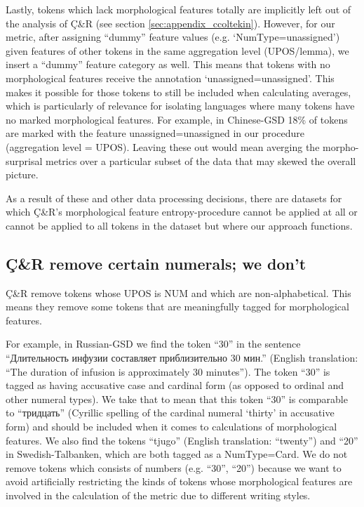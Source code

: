 \documentclass[USenglish]{article}
\begin{document}
Lastly, tokens which lack morphological features totally are implicitly left out of the analysis of Ç\&R (see section \ref{sec:appendix_ccoltekin}).
However, for our metric, after assigning ``dummy'' feature values  (e.g. `NumType=unassigned') given features of other tokens in the same aggregation level (UPOS/lemma), we insert a ``dummy'' feature category as well. 
This means that tokens with no morphological features receive the annotation `unassigned=unassigned'.
This makes it possible for those tokens to still be included when calculating averages, which is particularly of relevance for isolating languages where many tokens have no marked morphological features.
For example, in Chinese-GSD 18\% of tokens are marked with the feature unassigned=unassigned in our procedure (aggregation level = UPOS).
Leaving these out would mean averging the morpho-surprisal metrics over a particular subset of the data that may skewed the overall picture.

As a result of these and other data processing decisions, there are datasets for which Ç\&R's morphological feature entropy-procedure cannot be applied at all or cannot be applied to all tokens in the dataset but where our approach functions. 

\subsection{Ç\&R remove certain numerals; we don't} \label{appedix:differences_remove_numerals}

Ç\&R remove tokens whose UPOS is NUM and which are non-alphabetical.
This means they remove some tokens that are meaningfully tagged for morphological features. 

For example, in Russian-GSD we find the token ``30'' in the sentence ``{\cyrillicfont Длительность инфузии составляет приблизительно 30 мин}.'' (English translation: ``The duration of infusion is approximately 30 minutes''). 
The token ``30'' is tagged as having accusative case and cardinal form (as opposed to ordinal and other numeral types). 
We take that to mean that this token ``30'' is comparable to ``{\cyrillicfont тридцать}'' (Cyrillic spelling of the cardinal numeral `thirty' in accusative form) and should be included when it comes to calculations of morphological features.
We also find the tokens ``tjugo'' (English translation: ``twenty'') and ``20'' in Swedish-Talbanken, which are both tagged as a NumType=Card.
We do not remove tokens which consists of numbers (e.g. ``30'', ``20'') because we want to avoid artificially restricting the kinds of tokens whose morphological features are involved in the calculation of the metric due to different writing styles.
\end{document}

